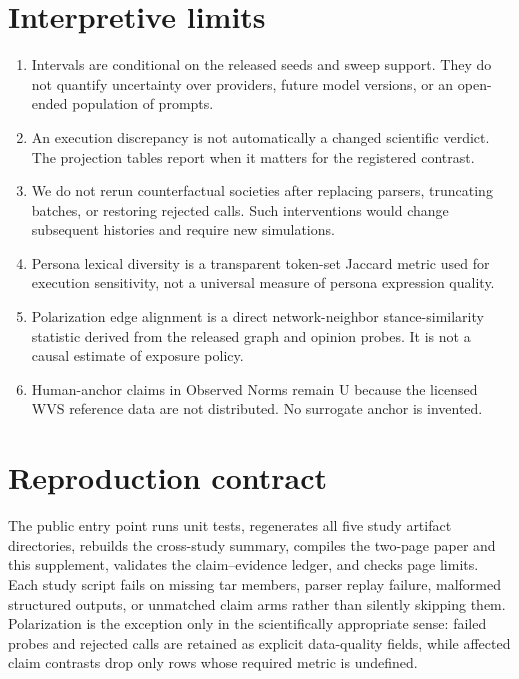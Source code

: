 \documentclass[10pt]{article}
\begin{document}
\section{Interpretive limits}
\begin{enumerate}[leftmargin=1.4em,itemsep=0.15em]
\item Intervals are conditional on the released seeds and sweep support. They do not quantify uncertainty over providers, future model versions, or an open-ended population of prompts.
\item An execution discrepancy is not automatically a changed scientific verdict. The projection tables report when it matters for the registered contrast.
\item We do not rerun counterfactual societies after replacing parsers, truncating batches, or restoring rejected calls. Such interventions would change subsequent histories and require new simulations.
\item Persona lexical diversity is a transparent token-set Jaccard metric used for execution sensitivity, not a universal measure of persona expression quality.
\item Polarization edge alignment is a direct network-neighbor stance-similarity statistic derived from the released graph and opinion probes. It is not a causal estimate of exposure policy.
\item Human-anchor claims in Observed Norms remain U because the licensed WVS reference data are not distributed. No surrogate anchor is invented.
\end{enumerate}

\section{Reproduction contract}
The public entry point runs unit tests, regenerates all five study artifact directories, rebuilds the cross-study summary, compiles the two-page paper and this supplement, validates the claim--evidence ledger, and checks page limits. Each study script fails on missing tar members, parser replay failure, malformed structured outputs, or unmatched claim arms rather than silently skipping them. Polarization is the exception only in the scientifically appropriate sense: failed probes and rejected calls are retained as explicit data-quality fields, while affected claim contrasts drop only rows whose required metric is undefined.
\end{document}
